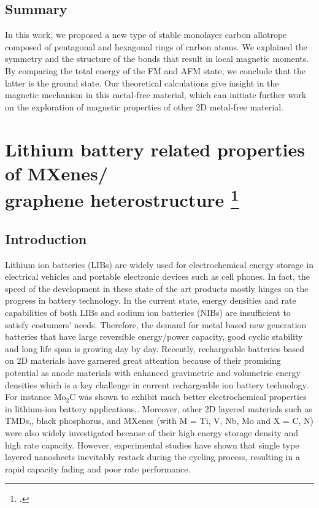 \subsection{Summary}
In this work, we proposed a new type of stable monolayer carbon allotrope composed of pentagonal and hexagonal rings of carbon atoms. We explained the symmetry and the structure of the bonds that result in local magnetic moments. By comparing the total energy of the FM and AFM state, we conclude that the latter is the ground state. Our theoretical calculations give insight in the magnetic mechanism in this metal-free material, which can initiate further work on the exploration of magnetic properties of other 2D metal-free material. 


\section[Lithium battery related properties of MXenes/ \\ graphene heterostructure]{Lithium battery related properties of MXenes/ \protect\\ graphene heterostructure \footcite[This work is submitted:][]{Aierken2017.battery} \label{Li_MG}}

\subsection{Introduction}
Lithium ion batteries (LIBs) are widely used for electrochemical energy storage in electrical vehicles and portable electronic devices such as cell phones. In fact, the speed of the development in these state of the art products mostly hinges on the progress in battery technology. In the current state, energy densities and rate capabilities of both LIBs and sodium ion batteries (NIBs) are insufficient to satisfy costumers' needs. Therefore, the demand for metal based new generation batteries that have large reversible energy/power capacity, good cyclic stability and long life span is growing day by day. Recently, rechargeable batteries based on 2D materials have garnered great attention because of their promising potential as anode materials with enhanced gravimetric and volumetric energy densities which is a key challenge in current rechargeable ion battery technology. For instance Mo$_2$C was shown to exhibit much better electrochemical properties in lithium-ion battery applications,\cite{mo2c-ref8}. Moreover, other 2D layered materials such as TMDs,\cite{mo2c-ref11, mo2c-ref12}, black phosphorus\cite{mo2c-ref18, mo2c-ref20}, and MXenes (with M = Ti, V, Nb, Mo and X = C, N)\cite{mo2c-ref13,ti3c2-mxenes,doi:10.1021/ja405735d} were also widely investigated because of their high energy storage density and high rate capacity. However, experimental studies have shown that single type layered nanosheets inevitably restack during the cycling process, resulting in a rapid capacity fading and poor rate performance. 

